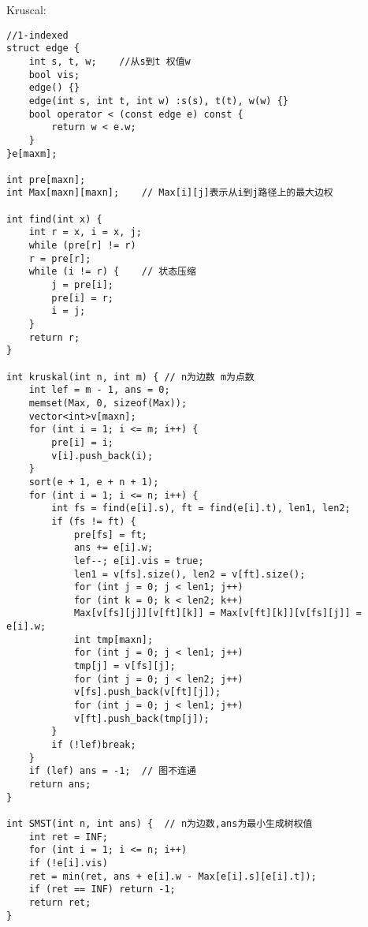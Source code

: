 Kruscal:
\begin{lstlisting}
//1-indexed
struct edge {
	int s, t, w;	//从s到t 权值w
	bool vis;
	edge() {}
	edge(int s, int t, int w) :s(s), t(t), w(w) {}
	bool operator < (const edge e) const {
		return w < e.w;
	}
}e[maxm];

int pre[maxn];
int Max[maxn][maxn];	// Max[i][j]表示从i到j路径上的最大边权

int find(int x) {
	int r = x, i = x, j;
	while (pre[r] != r)
	r = pre[r];
	while (i != r) {	// 状态压缩
		j = pre[i];
		pre[i] = r;
		i = j;
	}
	return r;
}

int kruskal(int n, int m) {	// n为边数 m为点数
	int lef = m - 1, ans = 0;
	memset(Max, 0, sizeof(Max));
	vector<int>v[maxn];
	for (int i = 1; i <= m; i++) {
		pre[i] = i;
		v[i].push_back(i);
	}
	sort(e + 1, e + n + 1);
	for (int i = 1; i <= n; i++) {
		int fs = find(e[i].s), ft = find(e[i].t), len1, len2;
		if (fs != ft) {
			pre[fs] = ft;
			ans += e[i].w;
			lef--; e[i].vis = true;
			len1 = v[fs].size(), len2 = v[ft].size();
			for (int j = 0; j < len1; j++)
			for (int k = 0; k < len2; k++)
			Max[v[fs][j]][v[ft][k]] = Max[v[ft][k]][v[fs][j]] = e[i].w;
			int tmp[maxn];
			for (int j = 0; j < len1; j++)
			tmp[j] = v[fs][j];
			for (int j = 0; j < len2; j++)
			v[fs].push_back(v[ft][j]);
			for (int j = 0; j < len1; j++)
			v[ft].push_back(tmp[j]);
		}
		if (!lef)break;
	}
	if (lef) ans = -1;	// 图不连通
	return ans;
}

int SMST(int n, int ans) {	// n为边数,ans为最小生成树权值
	int ret = INF;
	for (int i = 1; i <= n; i++)
	if (!e[i].vis)
	ret = min(ret, ans + e[i].w - Max[e[i].s][e[i].t]);
	if (ret == INF) return -1;
	return ret;
}
\end{lstlisting}

